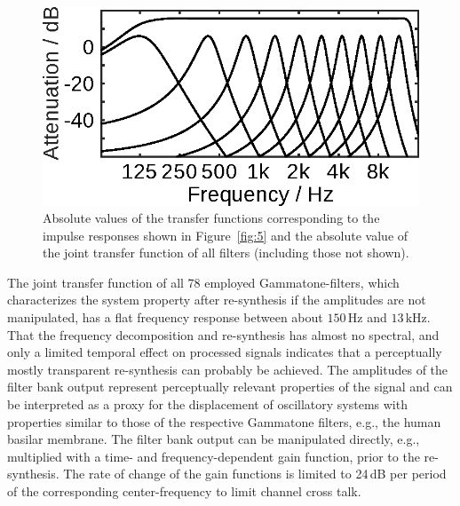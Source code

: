 \documentclass[10pt,a4paper,twocolumn]{article}
\begin{document}
%
\begin{figure}[h]
	\centerline{\includegraphics[width=.65\columnwidth]{images/gammatone_filter_transfer}}
	\caption{Absolute values of the transfer functions corresponding to the impulse responses shown in Figure~\ref{fig:5} and the absolute value of the joint transfer function of all filters (including those not shown).}
	\label{fig:6}
\end{figure} 
%
The joint transfer function of all 78 employed Gammatone-filters, which characterizes the system property after re-synthesis if the amplitudes are not manipulated, has a flat frequency response between about $150\,\text{Hz}$ and $13\,\text{kHz}$.
%
That the frequency decomposition and re-synthesis has almost no spectral, and only a limited temporal effect on processed signals indicates that a perceptually mostly transparent re-synthesis can probably be achieved.
%
The amplitudes of the filter bank output represent perceptually relevant properties of the signal and can be interpreted as a proxy for the displacement of oscillatory systems with properties similar to those of the respective Gammatone filters, e.g., the human basilar membrane.
%
The filter bank output can be manipulated directly, e.g., multiplied with a time- and frequency-dependent gain function, prior to the re-synthesis.
%
The rate of change of the gain functions is limited to 24\,dB per period of the corresponding center-frequency to limit channel cross talk.
\end{document}
